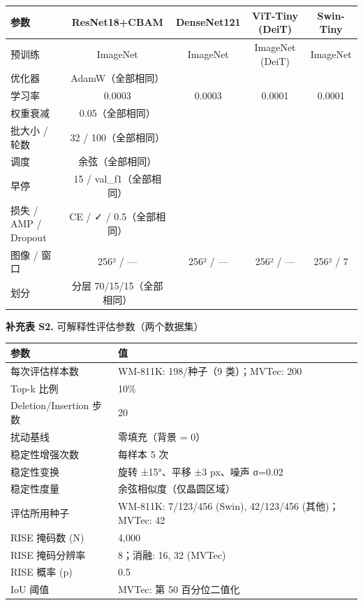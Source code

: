 \documentclass[11pt,a4paper]{article}
\begin{document}
\begin{tabular}{lcccc}
\toprule
参数 & ResNet18+CBAM & DenseNet121 & ViT-Tiny (DeiT) & Swin-Tiny \\
\midrule
预训练 & ImageNet & ImageNet & ImageNet (DeiT) & ImageNet \\
优化器 & AdamW（全部相同） &  &  &  \\
学习率 & 0.0003 & 0.0003 & 0.0001 & 0.0001 \\
权重衰减 & 0.05（全部相同） &  &  &  \\
批大小 / 轮数 & 32 / 100（全部相同） &  &  &  \\
调度 & 余弦（全部相同） &  &  &  \\
早停 & 15 / val\_f1（全部相同） &  &  &  \\
损失 / AMP / Dropout & CE / ✓ / 0.5（全部相同） &  &  &  \\
图像 / 窗口 & 256² / — & 256² / — & 256² / — & 256² / 7 \\
划分 & 分层 70/15/15（全部相同） &  &  &  \\
\bottomrule
\end{tabular}


\begin{center}
\small \textbf{补充表 S2.} 可解释性评估参数（两个数据集）
\end{center}
\begin{tabular}{ll}
\toprule
参数 & 值 \\
\midrule
每次评估样本数 & WM-811K: 198/种子（9 类）；MVTec: 200 \\
Top-k 比例 & 10\% \\
Deletion/Insertion 步数 & 20 \\
扰动基线 & 零填充（背景 = 0） \\
稳定性增强次数 & 每样本 5 次 \\
稳定性变换 & 旋转 ±15°、平移 ±3 px、噪声 σ=0.02 \\
稳定性度量 & 余弦相似度（仅晶圆区域） \\
评估所用种子 & WM-811K: 7/123/456 (Swin), 42/123/456 (其他)；MVTec: 42 \\
RISE 掩码数 (N) & 4,000 \\
RISE 掩码分辨率 & 8；消融: 16, 32 (MVTec) \\
RISE 概率 (p) & 0.5 \\
IoU 阈值 & MVTec: 第 50 百分位二值化 \\
\bottomrule
\end{tabular}
\end{document}
